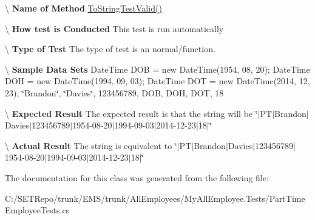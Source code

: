 \textbackslash{} {\bfseries  Name of Method} \hyperlink{class_my_all_employee_1_1_tests_1_1_parttime_employee_tests_a93e1c4eaf3750132e8e60df585eb4be4}{To\+String\+Test\+Valid()}

\textbackslash{} {\bfseries  How test is Conducted} This test is run automatically

\textbackslash{} {\bfseries  Type of Test} The type of test is an normal/function.

\textbackslash{} {\bfseries  Sample Data Sets} Date\+Time D\+O\+B = new Date\+Time(1954, 08, 20); Date\+Time D\+O\+H = new Date\+Time(1994, 09, 03); Date\+Time D\+O\+T = new Date\+Time(2014, 12, 23); \char`\"{}\+Brandon\char`\"{}, \char`\"{}\+Davies\char`\"{}, 123456789, D\+O\+B, D\+O\+H, D\+O\+T, 18

\textbackslash{} {\bfseries  Expected Result} The expected result is that the string will be \char`\"{}$\vert$\+P\+T$\vert$\+Brandon$\vert$\+Davies$\vert$123456789$\vert$1954-\/08-\/20$\vert$1994-\/09-\/03$\vert$2014-\/12-\/23$\vert$18$\vert$\char`\"{}

\textbackslash{} {\bfseries  Actual Result} The string is equivalent to \char`\"{}$\vert$\+P\+T$\vert$\+Brandon$\vert$\+Davies$\vert$123456789$\vert$1954-\/08-\/20$\vert$1994-\/09-\/03$\vert$2014-\/12-\/23$\vert$18$\vert$\char`\"{} 

The documentation for this class was generated from the following file\+:\begin{DoxyCompactItemize}
\item 
C\+:/\+S\+E\+T\+Repo/trunk/\+E\+M\+S/trunk/\+All\+Employees/\+My\+All\+Employee.\+Tests/Part\+Time\+Employee\+Tests.\+cs\end{DoxyCompactItemize}
